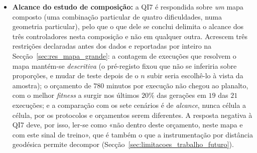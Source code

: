 \documentclass[12pt,reqno, twoside]{amsbook}
\theoremstyle{plain}
\numberwithin{equation}{chapter}
\numberwithin{section}{chapter}
\numberwithin{table}{chapter}
\numberwithin{figure}{chapter}
\begin{document}
\begin{itemize}
    \item \textbf{Alcance do estudo de composição:} a QI7 é respondida sobre \emph{um} mapa composto (uma combinação particular de quatro dificuldades, numa geometria particular), pelo que o que dele se conclui delimita o alcance dos três controladores nesta composição e não em qualquer outra. Acrescem três restrições declaradas antes dos dados e reportadas por inteiro na Secção~\ref{sec:res_mapa_grande}: a contagem de execuções que resolvem o mapa mantém-se \emph{descritiva} (o pré-registo fixou que não se inferiria sobre proporções, e mudar de teste depois de o $n$ subir seria escolhê-lo à vista da amostra); o orçamento de $780$ minutos por execução não chegou ao planalto, com o melhor \textit{fitness} a surgir nos últimos $20\%$ das gerações em $19$ das $21$ execuções; e a comparação com os sete cenários é de \emph{alcance}, nunca célula a célula, por os protocolos e orçamentos serem diferentes. A resposta negativa à QI7 deve, por isso, ler-se como «não dentro deste orçamento, neste mapa e com este sinal de treino», que é também o que a instrumentação por distância geodésica permite decompor (Secção~\ref{sec:limitacoes_trabalho_futuro}).
\end{itemize}
\end{document}
